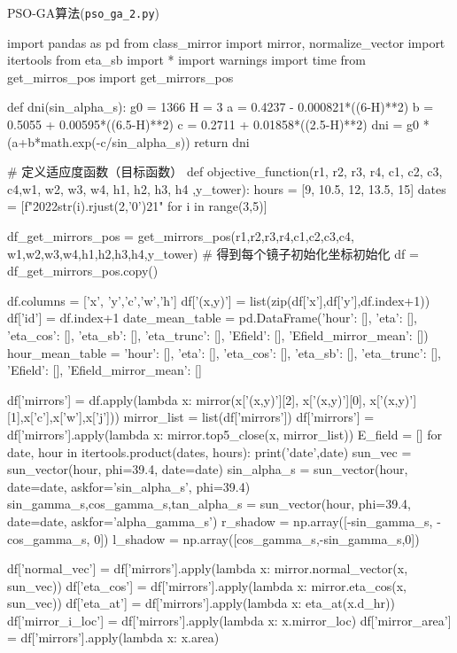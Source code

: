 \documentclass{article}
\numberwithin{equation}{subsection}
\begin{document}
PSO-GA算法(\verb|pso_ga_2.py|)
\begin{python}
import pandas as pd
from class_mirror import mirror, normalize_vector
import itertools
from eta_sb import *
import warnings
import time
from get_mirros_pos import get_mirrors_pos

def dni(sin_alpha_s):
    g0 = 1366
    H = 3
    a = 0.4237 - 0.000821*((6-H)**2)
    b = 0.5055 + 0.00595*((6.5-H)**2)
    c = 0.2711 + 0.01858*((2.5-H)**2)
    dni = g0 * (a+b*math.exp(-c/sin_alpha_s))
    return dni


# 定义适应度函数（目标函数）
def objective_function(r1, r2, r3, r4, c1,  c2, c3, c4,w1, w2, w3, w4, h1, h2, h3, h4 ,y_tower):
    hours = [9, 10.5, 12, 13.5, 15]
    dates = [f"2022{str(i).rjust(2,'0')}21" for i in range(3,5)]

    df_get_mirrors_pos = get_mirrors_pos(r1,r2,r3,r4,c1,c2,c3,c4,
                                w1,w2,w3,w4,h1,h2,h3,h4,y_tower)  # 得到每个镜子初始化坐标初始化
    df = df_get_mirrors_pos.copy()

    df.columns = ['x', 'y','c','w','h']
    df['(x,y)'] = list(zip(df['x'],df['y'],df.index+1))
    df['id'] = df.index+1
    date_mean_table = pd.DataFrame({'hour': [], 'eta': [], 'eta_cos': [], 'eta_sb': [], 'eta_trunc': [], 'Efield': [], 'Efield_mirror_mean': []})
    hour_mean_table = {'hour': [], 'eta': [], 'eta_cos': [], 'eta_sb': [], 'eta_trunc': [], 'Efield': [],
                       'Efield_mirror_mean': []}

    df['mirrors'] = df.apply(lambda x: mirror(x['(x,y)'][2], x['(x,y)'][0], x['(x,y)'][1],x['c'],x['w'],x['j']))
    mirror_list = list(df['mirrors'])
    df['mirrors'] = df['mirrors'].apply(lambda x: mirror.top5_close(x, mirror_list))
    E_field = []
    for date, hour in itertools.product(dates, hours):
        print('date',date)
        sun_vec = sun_vector(hour, phi=39.4, date=date)
        sin_alpha_s = sun_vector(hour, date=date, askfor='sin_alpha_s', phi=39.4)
        sin_gamma_s,cos_gamma_s,tan_alpha_s = sun_vector(hour, phi=39.4, date=date, askfor='alpha_gamma_s')
        r_shadow = np.array([-sin_gamma_s, -cos_gamma_s, 0])
        l_shadow = np.array([cos_gamma_s,-sin_gamma_s,0])

        df['normal_vec'] = df['mirrors'].apply(lambda x: mirror.normal_vector(x, sun_vec))
        df['eta_cos'] = df['mirrors'].apply(lambda x: mirror.eta_cos(x, sun_vec))
        df['eta_at'] = df['mirrors'].apply(lambda x: eta_at(x.d_hr))
        df['mirror_i_loc'] = df['mirrors'].apply(lambda x: x.mirror_loc)
        df['mirror_area'] = df['mirrors'].apply(lambda x: x.area)


\end{python}
\end{document}
